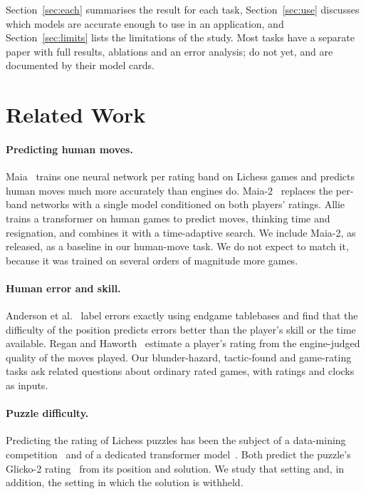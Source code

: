 \documentclass[11pt]{article}
\begin{document}
Section~\ref{sec:each} summarises the result for each task,
Section~\ref{sec:use} discusses which models are accurate enough to use in an
application, and Section~\ref{sec:limits} lists the limitations of the study.
Most tasks have a separate paper with full results, ablations and an error
analysis;  do not yet, and are documented by their
model cards.

\section{Related Work}
\label{sec:related}

\paragraph{Predicting human moves.}
Maia~\cite{maia} trains one neural network per rating band on Lichess games
and predicts human moves much more accurately than engines do.
Maia-2~\cite{maia2} replaces the per-band networks with a single model
conditioned on both players' ratings. Allie~\cite{allie} trains a transformer
on human games to predict moves, thinking time and resignation, and combines
it with a time-adaptive search. We include Maia-2, as released, as a baseline
in our human-move task. We do not expect to match it, because it was trained
on several orders of magnitude more games.

\paragraph{Human error and skill.}
Anderson et al.~\cite{humanerror} label errors exactly using endgame
tablebases and find that the difficulty of the position predicts errors
better than the player's skill or the time available. Regan and
Haworth~\cite{intrinsic} estimate a player's rating from the engine-judged
quality of the moves played. Our blunder-hazard, tactic-found and game-rating
tasks ask related questions about ordinary rated games, with ratings and
clocks as inputs.

\paragraph{Puzzle difficulty.}
Predicting the rating of Lichess puzzles has been the subject of a
data-mining competition~\cite{puzzlecup} and of a dedicated transformer
model~\cite{glickformer}. Both predict the puzzle's
Glicko-2 rating~\cite{glicko2} from its position and solution. We study that
setting and, in addition, the setting in which the solution is withheld.
\end{document}
